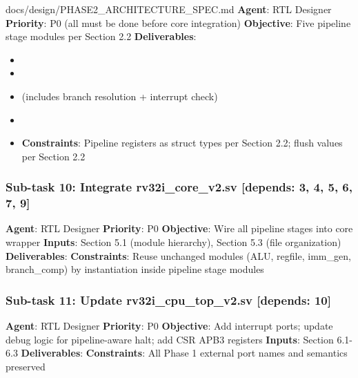 \begin{relocated}{docs/design/PHASE2_ARCHITECTURE_SPEC.md}
\textbf{Agent}: RTL Designer \textbf{Priority}: P0 (all must be done
before core integration) \textbf{Objective}: Five pipeline stage modules
per Section 2.2 \textbf{Deliverables}:

\begin{itemize}
\tightlist
\item
\item
\item
   (includes branch
  resolution + interrupt check)
\item
\item
   \textbf{Constraints}:
  Pipeline registers as struct types per Section 2.2; flush values per
  Section 2.2
\end{itemize}

\subsubsection{\texorpdfstring{Sub-task 10: Integrate
rv32i\_\allowbreak{}core\_\allowbreak{}v2.sv {[}depends: 3, 4, 5, 6, 7,
9{]}}{Sub-task 10: Integrate rv32i\_core\_v2.sv {[}depends: 3, 4, 5, 6, 7, 9{]}}}\label{ds:ch:phase2-architecture:sub-task-10-integrate-rv32i-core-v2sv-depends-3-4-5-6-7-9}

\textbf{Agent}: RTL Designer \textbf{Priority}: P0 \textbf{Objective}:
Wire all pipeline stages into core wrapper \textbf{Inputs}: Section 5.1
(module hierarchy), Section 5.3 (file organization)
\textbf{Deliverables}: 
\textbf{Constraints}: Reuse unchanged modules (ALU, regfile, imm\_gen,
branch\_\allowbreak{}comp) by instantiation inside pipeline stage
modules

\subsubsection{\texorpdfstring{Sub-task 11: Update
rv32i\_\allowbreak{}cpu\_\allowbreak{}top\_\allowbreak{}v2.sv
{[}depends:
10{]}}{Sub-task 11: Update rv32i\_cpu\_top\_v2.sv {[}depends: 10{]}}}\label{ds:ch:phase2-architecture:sub-task-11-update-rv32i-cpu-top-v2sv-depends-10}

\textbf{Agent}: RTL Designer \textbf{Priority}: P0 \textbf{Objective}:
Add interrupt ports; update debug logic for pipeline-aware halt; add CSR
APB3 registers \textbf{Inputs}: Section 6.1-6.3 \textbf{Deliverables}:
 \textbf{Constraints}: All Phase 1
external port names and semantics preserved


\end{relocated}
